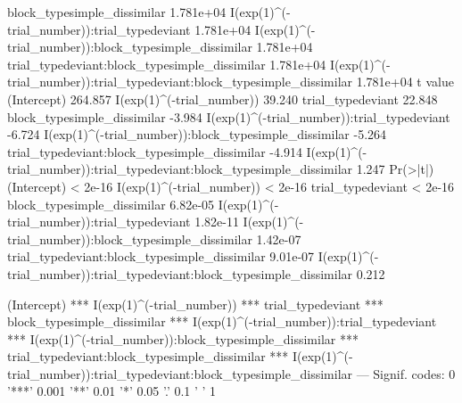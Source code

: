 \documentclass[10pt, letterpaper]{article}
\newenvironment{CodeChunk}{}{}
\begin{document}
\begin{CodeChunk}
\begin{CodeOutput}
block_typesimple_dissimilar                                              1.781e+04
I(exp(1)^(-trial_number)):trial_typedeviant                              1.781e+04
I(exp(1)^(-trial_number)):block_typesimple_dissimilar                    1.781e+04
trial_typedeviant:block_typesimple_dissimilar                            1.781e+04
I(exp(1)^(-trial_number)):trial_typedeviant:block_typesimple_dissimilar  1.781e+04
                                                                        t value
(Intercept)                                                             264.857
I(exp(1)^(-trial_number))                                                39.240
trial_typedeviant                                                        22.848
block_typesimple_dissimilar                                              -3.984
I(exp(1)^(-trial_number)):trial_typedeviant                              -6.724
I(exp(1)^(-trial_number)):block_typesimple_dissimilar                    -5.264
trial_typedeviant:block_typesimple_dissimilar                            -4.914
I(exp(1)^(-trial_number)):trial_typedeviant:block_typesimple_dissimilar   1.247
                                                                        Pr(>|t|)
(Intercept)                                                              < 2e-16
I(exp(1)^(-trial_number))                                                < 2e-16
trial_typedeviant                                                        < 2e-16
block_typesimple_dissimilar                                             6.82e-05
I(exp(1)^(-trial_number)):trial_typedeviant                             1.82e-11
I(exp(1)^(-trial_number)):block_typesimple_dissimilar                   1.42e-07
trial_typedeviant:block_typesimple_dissimilar                           9.01e-07
I(exp(1)^(-trial_number)):trial_typedeviant:block_typesimple_dissimilar    0.212
                                                                           
(Intercept)                                                             ***
I(exp(1)^(-trial_number))                                               ***
trial_typedeviant                                                       ***
block_typesimple_dissimilar                                             ***
I(exp(1)^(-trial_number)):trial_typedeviant                             ***
I(exp(1)^(-trial_number)):block_typesimple_dissimilar                   ***
trial_typedeviant:block_typesimple_dissimilar                           ***
I(exp(1)^(-trial_number)):trial_typedeviant:block_typesimple_dissimilar    
---
Signif. codes:  0 '***' 0.001 '**' 0.01 '*' 0.05 '.' 0.1 ' ' 1


\end{CodeOutput}
\end{CodeChunk}
\end{document}
